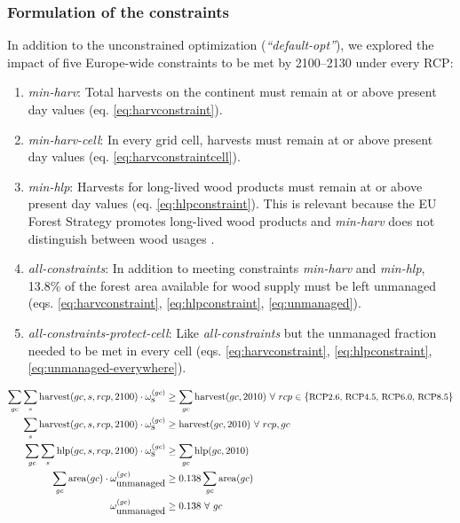 \documentclass[]{article}
\begin{document}
\subsubsection{Formulation of the constraints}


In addition to the unconstrained optimization (\textit{``default-opt''}), we explored the impact of five Europe-wide constraints to be met by 2100--2130 under every RCP:

\begin{enumerate}
	\item \textit{min-harv}: Total harvests on the continent must remain at or above present day values (eq. \ref{eq:harvconstraint}).
	\item \textit{min-harv-cell}: In every grid cell, harvests must remain at or above present day values (eq. \ref{eq:harvconstraintcell}).
	\item \textit{min-hlp}: Harvests for long-lived wood products must remain at or above present day values (eq. \ref{eq:hlpconstraint}). This is relevant because the EU Forest Strategy promotes long-lived wood products and \textit{min-harv} does not distinguish between wood usages \parencite{EUForestStrategy2030}.
	\item \textit{all-constraints}: In addition to meeting constraints \textit{min-harv} and \textit{min-hlp}, 13.8\% of the forest area available for wood supply must be left unmanaged (eqs. \ref{eq:harvconstraint}, \ref{eq:hlpconstraint}, \ref{eq:unmanaged}).
	\item \textit{all-constraints-protect-cell}: Like \textit{all-constraints} but the unmanaged fraction needed to be met in every cell (eqs. \ref{eq:harvconstraint}, \ref{eq:hlpconstraint}, \ref{eq:unmanaged-everywhere}).
\end{enumerate}


\begin{align}
	\sum_{gc} \sum_{s} \mbox{harvest}(gc, s, rcp, 2100) \cdot \omega_{\mbox{s}}^{(gc)} & \geq  \sum_{gc} \mbox{harvest}(gc, 2010) ~ \forall ~ rcp \in \{\text{\small{RCP2.6, RCP4.5, RCP6.0, RCP8.5}}\} \label{eq:harvconstraint} \\
	\sum_{s} \mbox{harvest}(gc, s, rcp, 2100) \cdot \omega_{\mbox{s}}^{(gc)} & \geq  \mbox{harvest}(gc, 2010) ~ \forall ~ rcp, gc \label{eq:harvconstraintcell} \\
	\sum_{gc} \sum_{s} \mbox{hlp}(gc, s, rcp, 2100) \cdot \omega_{\mbox{s}}^{(gc)} & \geq  \sum_{gc} \mbox{hlp}(gc, 2010) \label{eq:hlpconstraint} \\
	\sum_{gc} \mbox{area}(gc)\cdot \omega_{\mbox{unmanaged}}^{(gc)} & \geq 0.138  \sum_{gc} \mbox{area}(gc) \label{eq:unmanaged} \\
	\omega^{(gc)}_{\mbox{unmanaged}} & \geq 0.138 ~ \forall ~ gc \label{eq:unmanaged-everywhere}
\end{align}
\end{document}

